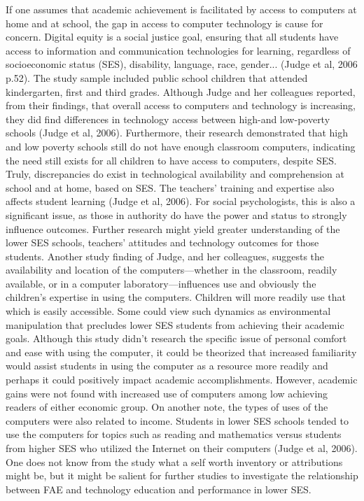 If one assumes that academic achievement is facilitated by access to computers at 
home and at school, the gap in access to computer technology is cause for   
concern. Digital equity is a social justice goal, ensuring that all students have 
access to information and communication technologies for learning, regardless of 
socioeconomic status (SES), disability, language, race, gender... (Judge et al, 2006 
p.52).  
     The study sample included public school children that attended kindergarten, first and third grades.  Although Judge and her colleagues reported, from their findings, that overall access to computers and technology is increasing, they did find differences in technology access between high-and low-poverty schools (Judge et al, 2006).  Furthermore, their research demonstrated that high and low poverty schools still do not have enough classroom computers, indicating the need still exists for all children to have access to computers, despite SES. Truly, discrepancies do exist in technological availability and comprehension at school and at home, based on SES. The teachers’ training and expertise also affects student learning (Judge et al, 2006).  For social psychologists, this is also a significant issue, as those in authority do have the power and status to strongly influence outcomes.  Further research might yield greater understanding of the lower SES schools, teachers’ attitudes and technology outcomes for those students. Another study finding of Judge, and her colleagues, suggests the availability and location of the computers—whether in the classroom, readily available, or in a computer laboratory—influences use and obviously the children’s expertise in using the computers. Children will more readily use that which is easily accessible. Some could view such dynamics as environmental manipulation that precludes lower SES students from achieving their academic goals. Although this study didn’t research the specific issue of personal comfort and ease with using the computer, it could be theorized that increased familiarity would assist students in using the computer as a resource more readily and perhaps it could positively impact academic accomplishments. However, academic gains were not found with increased use of computers among low achieving readers of either economic group. On another note, the types of uses of the computers were also related to income. Students in lower SES schools tended to use the computers for topics such as reading and mathematics versus students from higher SES who utilized the Internet on their computers (Judge et al, 2006). One does not know from the study what a self worth inventory or attributions might be, but it might be salient for further studies to investigate the relationship between FAE and technology education and performance in lower SES. 
